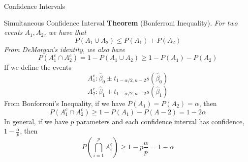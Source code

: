 \documentclass{article}
\begin{document}
\begin{multicols*}{3}
\begin{blackbox}{Confidence Intervals}
        \begin{redbox}{Simultaneous Confidence Interval}
            \textbf{Theorem} (Bonferroni Inequality). \textit{
                For two events $A_1, A_2$, we have that\\[-2ex]
                \[P(A_1 \cup A_2) \leq P(A_1) + P(A_2)\]
                From DeMorgan's identity, we also have \\[-2ex]
                \[P(A_1^c \cap A_2^c) = 1 - P(A_1 \cup A_2) \geq 1 - P(A_1) - P(A_2)\]
            }
            \noindent
            If we define the events \\[-2ex]
            \[A_1^c: \hat{\beta}_0 \pm t_{1-\alpha/2, n-2}s(\hat{\beta}_0)\]
            \[A_2^c: \hat{\beta}_1 \pm t_{1-\alpha/2, n-2}s(\hat{\beta}_1)\]
            From Bonforroni's Inequality, if we have $P(A_1) = P(A_2) = \alpha$, then \\[-2ex]
            \[P(A_1^c \cap A_2^c) \geq 1 - P(A_1) - P(A-2) = 1 - 2\alpha\]
            In general, if we have $p$ parameters and each confidence interval has confidence, $1- \frac{\alpha}{p}$, then \\[-2ex]
            \[P\left(\bigcap_{i=1}^p A_i^c\right) \geq 1 - p\frac{\alpha}{p} = 1 - \alpha\]
        \end{redbox}\\[-2ex]
    \end{blackbox}
    
\end{multicols*}
\end{document}
